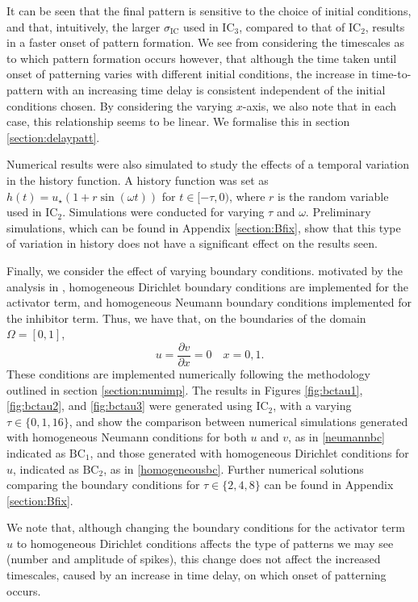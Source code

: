 It can be seen that the final pattern is sensitive to the choice of initial conditions, and that, intuitively, the larger $\sigma_{\text{IC}}$ used in $\text{IC}_3$, compared to that of $\text{IC}_2$, results in a faster onset of pattern formation. We see from considering the timescales as to which pattern formation occurs however, that although the time taken until onset of patterning varies with different initial conditions, the increase in time-to-pattern with an increasing time delay is consistent independent of the initial conditions chosen. By considering the varying $x$-axis, we also note that in each case, this relationship seems to be linear. We formalise this in section \ref{section:delaypatt}.

Numerical results were also simulated to study the effects of a temporal variation in the history function. A history function was set as $h(t)=u_\star(1+r\sin(\omega t))$ for $t\in[-\tau,0)$, where $r$ is the random variable used in $\text{IC}_2$. Simulations were conducted for varying $\tau$ and $\omega$. Preliminary simulations, which can be found in Appendix \ref{section:Bfix}, show that this type of variation in history does not have a significant effect on the results seen.

Finally, we consider the effect of varying boundary conditions. motivated by the analysis in \cite{krausemixed}, homogeneous Dirichlet boundary conditions are implemented for the activator term, and homogeneous Neumann boundary conditions implemented for the inhibitor term. Thus, we have that, on the boundaries of the domain $\Omega=[0,1]$,
\begin{equation}\label{homogeneousbc}
u=\frac{\partial v}{\partial x}=0 \quad x=0, 1.
\end{equation}
These conditions are implemented numerically following the methodology outlined in section \ref{section:numimp}. The results in Figures \ref{fig:bctau1}, \ref{fig:bctau2}, and \ref{fig:bctau3} were generated using $\text{IC}_2$, with a varying $\tau\in\{0,1,16\}$, and show the comparison between numerical simulations generated with homogeneous Neumann conditions for both $u$ and $v$, as in \eqref{neumannbc} indicated as $\text{BC}_1$, and those generated with homogeneous Dirichlet conditions for $u$, indicated as $\text{BC}_2$, as in \eqref{homogeneousbc}. Further numerical solutions comparing the boundary conditions for $\tau\in\{2,4,8\}$ can be found in Appendix \ref{section:Bfix}.

We note that, although changing the boundary conditions for the activator term $u$ to homogeneous Dirichlet conditions affects the type of patterns we may see (number and amplitude of spikes), this change does not affect the increased timescales, caused by an increase in time delay, on which onset of patterning occurs.

